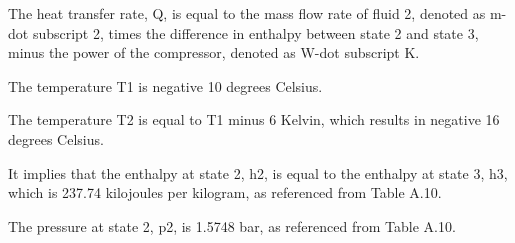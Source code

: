 The heat transfer rate, Q, is equal to the mass flow rate of fluid 2, denoted as m-dot subscript 2, times the difference in enthalpy between state 2 and state 3, minus the power of the compressor, denoted as W-dot subscript K.

The temperature T1 is negative 10 degrees Celsius.

The temperature T2 is equal to T1 minus 6 Kelvin, which results in negative 16 degrees Celsius.

It implies that the enthalpy at state 2, h2, is equal to the enthalpy at state 3, h3, which is 237.74 kilojoules per kilogram, as referenced from Table A.10.

The pressure at state 2, p2, is 1.5748 bar, as referenced from Table A.10.
